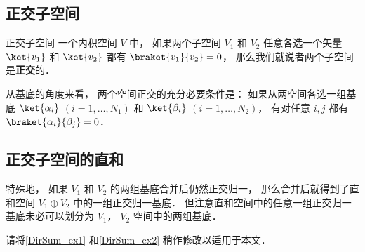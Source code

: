 
\subsection{正交子空间}

\begin{definition}{正交子空间}
一个内积空间 $V$ 中， 如果两个子空间 $V_1$ 和 $V_2$ 任意各选一个矢量 $\ket{v_1}$ 和 $\ket{v_2}$ 都有 $\braket{v_1}{v_2} = 0$， 那么我们就说者两个子空间是\textbf{正交}的．
\end{definition}

\begin{theorem}{}
从基底的角度来看， 两个空间正交的充分必要条件是： 如果从两空间各选一组基底 $\ket{\alpha_i}$ $(i = 1, \dots, N_1)$ 和 $\ket{\beta_i}$ $(i = 1, \dots, N_2)$， 有对任意 $i, j$ 都有 $\braket{\alpha_i}{\beta_j} = 0$．
\end{theorem}

\subsection{正交子空间的直和}
特殊地， 如果 $V_1$ 和 $V_2$ 的两组基底合并后仍然正交归一， 那么合并后就得到了直和空间 $V_1 \oplus V_2$ 中的一组正交归一基底． 但注意直和空间中的任意一组正交归一基底未必可以划分为 $V_1$， $V_2$ 空间中的两组基底．

\begin{exercise}{}
请将\autoref{DirSum_ex1} 和\autoref{DirSum_ex2} 稍作修改以适用于本文．
\end{exercise}
